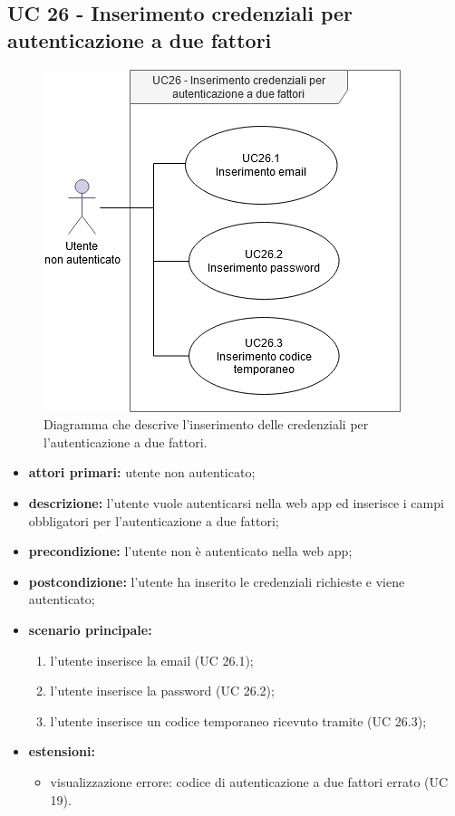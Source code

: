 		\subsection{UC 26 - Inserimento credenziali per autenticazione a due fattori}
		
		\begin{figure}[H]
			\centering
			\includegraphics[scale=0.675]{res/images/uc26}
			\caption{Diagramma che descrive l'inserimento delle credenziali per l'autenticazione a due fattori.}
		\end{figure}
		
		\begin{itemize}
			\item \textbf{attori primari:} utente non autenticato;
			\item \textbf{descrizione:} l'utente vuole autenticarsi nella web app ed inserisce i campi obbligatori per l'autenticazione a due fattori;
			\item \textbf{precondizione:} l'utente non è autenticato nella web app;
			\item \textbf{postcondizione:} l'utente ha inserito le credenziali richieste e viene autenticato;
			\item \textbf{scenario principale:}
			\begin{enumerate}
				\item l'utente inserisce la email (UC 26.1);
				\item l'utente inserisce la password (UC 26.2);
				\item l'utente inserisce un codice temporaneo ricevuto tramite  (UC 26.3);
			\end{enumerate}
			\item \textbf{estensioni:}
			\begin{itemize}
				\item visualizzazione errore: codice di autenticazione a due fattori errato (UC 19).
			\end{itemize}
		\end{itemize}
		
